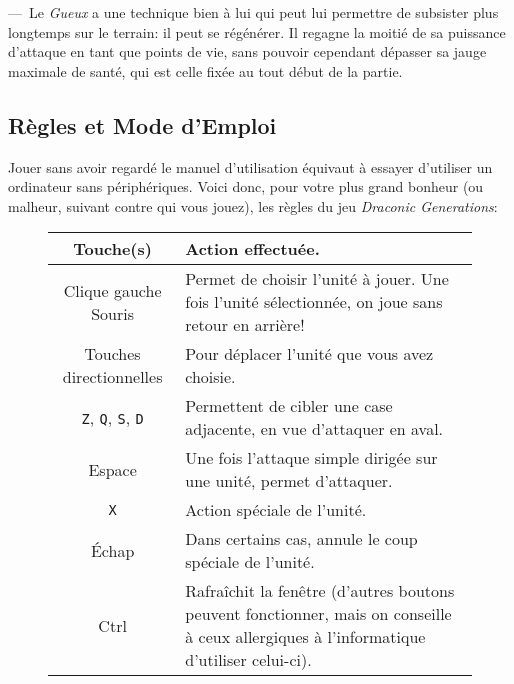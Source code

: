 \documentclass[11pt, a4paper, oneside, portrait]{article}
\begin{document}
            ---~Le \emph{Gueux} a une technique bien à lui qui peut lui permettre de subsister plus longtemps sur le terrain: il peut se régénérer.
            Il regagne la moitié de sa puissance d'attaque en tant que points de vie, sans pouvoir cependant dépasser sa jauge maximale de santé, qui est celle fixée au tout début de la partie.

        \subsection*{Règles et Mode d'Emploi}
            Jouer sans avoir regardé le manuel d'utilisation équivaut à essayer d'utiliser un ordinateur sans périphériques.
            Voici donc, pour votre plus grand bonheur (ou malheur, suivant contre qui vous jouez), les règles du jeu \emph{Draconic Generations}:
            \begin{figure}[H]
                \centering
                \begin{tabularx}{0.75\textwidth}{|c|X|}
                    \hline
                    \textbf{Touche(s)} & \textbf{Action effectuée.}\\
                    \hline\hline
                    Clique gauche Souris & Permet de choisir l'unité à jouer. Une fois l'unité sélectionnée, on joue sans retour en arrière!\\
                    \hline
                    Touches directionnelles & Pour déplacer l'unité que vous avez choisie.\\
                    \hline
                    \texttt{Z}, \texttt{Q}, \texttt{S}, \texttt{D} & Permettent de cibler une case adjacente, en vue d'attaquer en aval.\\
                    \hline
                    Espace & Une fois l'attaque simple dirigée sur une unité, permet d'attaquer.\\
                    \hline
                    \texttt{X} & Action spéciale de l'unité.\\
                    \hline
                    Échap & Dans certains cas, annule le coup spéciale de l'unité.\\
                    \hline
                    Ctrl & Rafraîchit la fenêtre (d'autres boutons peuvent fonctionner, mais on conseille à ceux allergiques à l'informatique d'utiliser celui-ci).\\
                    \hline
                \end{tabularx}
            \end{figure}
\end{document}
